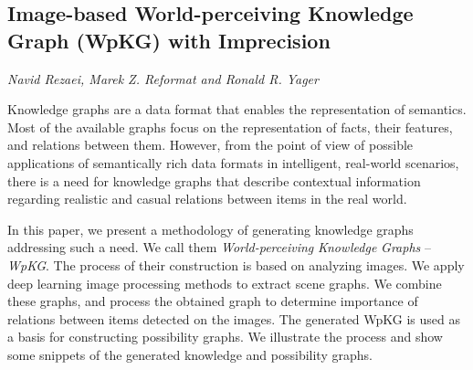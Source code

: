 \documentclass[../booklet.tex]{subfiles}
\begin{document}
\subsection[Image-based World-perceiving Knowledge Graph (WpKG) with Imprecision. {\it Navid Rezaei, Marek Z. Reformat and Ronald R. Yager}]{Image-based World-perceiving Knowledge Graph (WpKG) with Imprecision}
  

\begin{center}
  {\it Navid Rezaei, Marek Z. Reformat and Ronald R. Yager}
\end{center}




Knowledge graphs are a data format that enables the representation of semantics. Most of the available graphs focus on the representation of facts, their features, and relations between them. However, from the point of view of possible applications of semantically rich data formats in intelligent, real-world scenarios, there is a need for knowledge graphs that describe contextual information regarding realistic and casual relations between items in the real world.

In this paper, we present a methodology of generating knowledge graphs addressing such a need. We call them {\em World-perceiving} {\em Knowledge} {\em Gra\-phs} -- {\em WpKG}. The process of their construction is based on analyzing images. We apply deep learning image processing methods to extract scene graphs. We  combine these graphs, and process the obtained graph to determine  importance of relations between items detected on the images. The generated WpKG is used as a basis for constructing possibility graphs. We illustrate the process and show some snippets of the generated knowledge and possibility graphs.


\end{document}
